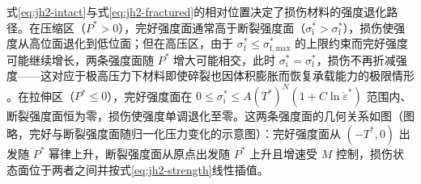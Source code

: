式\eqref{eq:jh2-intact}与式\eqref{eq:jh2-fractured}的相对位置决定了损伤材料的强度退化路径。在压缩区（$P^{*}>0$），完好强度面通常高于断裂强度面（$\sigma^{*}_{\mathrm{i}}>\sigma^{*}_{\mathrm{f}}$），损伤使强度从高位面退化到低位面；但在高压区，由于 $\sigma^{*}_{\mathrm{f}}\le\sigma^{*}_{\mathrm{f,max}}$ 的上限约束而完好强度可能继续增长，两条强度面随 $P^{*}$ 增大可能相交，此时 $\sigma^{*}_{\mathrm{i}}=\sigma^{*}_{\mathrm{f}}$，损伤不再折减强度——这对应于极高压力下材料即使碎裂也因体积膨胀而恢复承载能力的极限情形 \cite{JohnsonHolmquist1994,JohnsonHolmquist1999}。在拉伸区（$P^{*}\le0$），完好强度面在 $0\le\sigma^{*}_{\mathrm{i}}\le A(T^{*})^{N}(1+C\ln\dot{\varepsilon}^{*})$ 范围内、断裂强度面恒为零，损伤使强度单调退化至零。这两条强度面的几何关系如图（图略，完好与断裂强度面随归一化压力变化的示意图）：完好强度面从 $(-T^{*},0)$ 出发随 $P^{*}$ 幂律上升，断裂强度面从原点出发随 $P^{*}$ 上升且增速受 $M$ 控制，损伤状态面位于两者之间并按式\eqref{eq:jh2-strength}线性插值。

